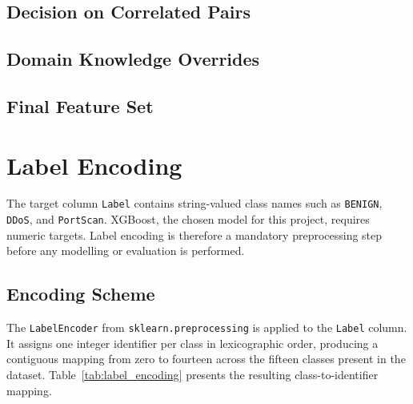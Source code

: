 \documentclass[12pt,a4paper]{article}
\begin{document}
\subsection{Decision on Correlated Pairs}

\subsection{Domain Knowledge Overrides}

\subsection{Final Feature Set}

\section{Label Encoding}

The target column \texttt{Label} contains string-valued class names such as
\texttt{BENIGN}, \texttt{DDoS}, and \texttt{PortScan}. XGBoost, the chosen model for this project, requires numeric targets. Label encoding
is therefore a mandatory preprocessing step before any modelling or evaluation
is performed.

\subsection{Encoding Scheme}

The \texttt{LabelEncoder} from \texttt{sklearn.preprocessing} is applied to the
\texttt{Label} column. It assigns one integer identifier per class in lexicographic
order, producing a contiguous mapping from zero to fourteen across the fifteen classes
present in the dataset. Table~\ref{tab:label_encoding} presents the resulting
class-to-identifier mapping.
\end{document}
